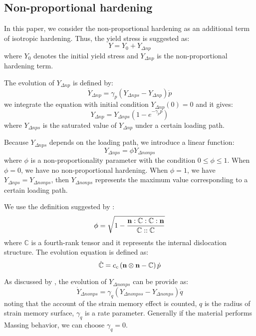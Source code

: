 \subsection{Non-proportional hardening}
\noindent
In this paper, we consider the non-proportional hardening as an additional term of isotropic hardening.
Thus, the yield stress is suggested as:
\begin{equation}
Y = {Y_0} + {Y_{\Delta np}}
\end{equation}
where $Y_0$ denotes the initial yield stress and ${Y_{\Delta np}}$ is the non-proportional hardening term.

The evolution of ${Y_{\Delta np}}$ is defined by:
\begin{equation}
{\dot Y_{\Delta np}} = {\gamma _p}\left( {{Y_{\Delta nps}} - {Y_{\Delta np}}} \right)\dot p
\end{equation}
we integrate the equation with initial condition ${Y_{\Delta np}}(0)=0$ and it gives:
\begin{equation}
{Y_{\Delta np}} = Y_{\Delta nps}\left( 1-e^{- \gamma_p p} \right)
\end{equation}
where $Y_{\Delta nps}$ is the saturated value of ${Y_{\Delta np}}$ under a certain loading path.

Because ${Y_{\Delta nps}}$ depends on the loading path, we introduce a linear function:
\begin{equation}
{Y_{\Delta nps}} = \phi {Y_{\Delta nonps}}
\end{equation}
where $\phi$ is a non-proportionality parameter with the condition $0 \leq \phi \leq 1$.
When $\phi = 0$, we have no non-proportional hardening.
When $\phi = 1$, we have ${Y_{\Delta nps}} = {Y_{\Delta nonps}}$, then ${Y_{\Delta nonps}}$ represents the maximum value corresponding to a certain loading path.

We use the definition suggested by \cite{tanaka1994nonproportionality}:
\begin{equation}
\phi  = \sqrt {1 - \frac{{{\bf{n}}:\mathbb{C}:\mathbb{C}:{\bf{n}}}}{{\mathbb{C}::\mathbb{C}}}}
\end{equation}
where $\mathbb{C}$ is a fourth-rank tensor and it represents the internal dislocation structure.
The evolution equation is defined as:
\begin{equation}
\dot {\mathbb{C}} = {c_c}\left( {{\bf{n}} \otimes {\bf{n}} - \mathbb{C}} \right)\dot p
\end{equation}

As discussed by \cite{fang2015cyclic}, the evolution of ${Y_{\Delta nonps}}$ can be provide as:
\begin{equation}
{\dot Y_{\Delta nonps}} = {\gamma _q}\left( {{Y_{\Delta nonpss}} - {Y_{\Delta nonps}}} \right)\dot q
\end{equation}
noting that the account of the strain memory effect is counted, $q$ is the radius of strain memory surface, ${\gamma _q}$ is a rate parameter.
Generally if the material performs Massing behavior, we can choose ${\gamma _q}=0$.

